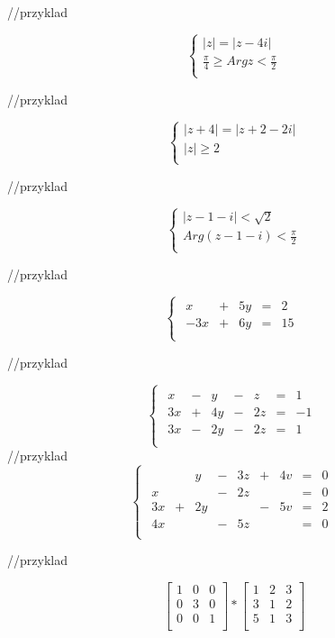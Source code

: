 \documentclass[a4paper]{article}
\begin{document}
//przyklad 

$$ \begin{cases}
|z| = |z-4i|\\
\frac{\pi}{4} \geq Arg z < \frac{\pi}{2} \\
\end{cases} $$


//przyklad 

$$ \begin{cases}
|z+4| = |z+2-2i|\\
|z| \geq 2 \\
\end{cases} $$

//przyklad 

$$ \begin{cases}
|z-1-i| < \sqrt{2} \\
Arg(z-1-i) < \frac{\pi}{2} \\
\end{cases} $$

//przyklad 

$$ \begin{cases}
\begin{array}{rrrrr}
x & + & 5y & = & 2\\
-3x & + & 6y & = & 15\\
\end{array}
\end{cases} $$

//przyklad
 
$$ \begin{cases}
\begin{array}{rrrrrrr} 
x & - & y & - & z & = & 1\\
3x & + & 4y & - & 2z & = & -1\\
3x & - & 2y & - & 2z & = & 1\\
\end{array}
\end{cases} $$
//przyklad 
$$ \begin{cases}
\begin{array}{rrrrrrrrr} 
& & y & - & 3z & + & 4v & = & 0\\
x &  &  & - & 2z & & & = & 0\\
3x & + & 2y &  &  & - & 5v & = & 2\\
4x &  &  & - & 5z &  &  & = & 0\\
\end{array}
\end{cases} $$

//przyklad 

$$\left[ \begin{array}{ccc}
1 & 0 & 0  \\
0 & 3 & 0  \\
0 & 0 & 1 \\
\end{array} \right]
*
\left[ \begin{array}{ccc}
1 & 2 & 3  \\
3 & 1 & 2  \\
5 & 1 & 3 \\
\end{array} \right]$$
\end{document}
